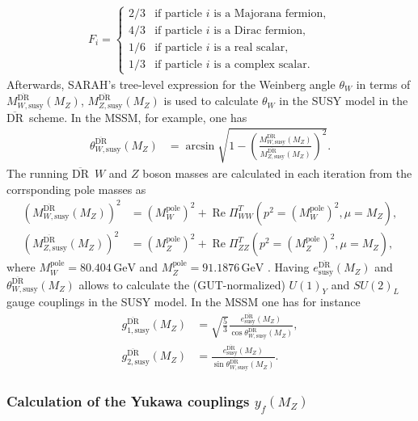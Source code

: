 \documentclass[final,3p,11pt,pdflatex]{elsarticle}
\newcommand{\textoverline}[1]{$\overline{\mbox{#1}}$}
\newcommand{\DRbar}{\textoverline{DR}\xspace}
\newcommand{\unit}[1]{\,\text{#1}}      %
\DeclareMathOperator{\re}{Re}
\begin{document}
%
\begin{align}
  F_i =
  \begin{cases}
    2/3 & \text{if particle $i$ is a Majorana fermion},\\
    4/3 & \text{if particle $i$ is a Dirac fermion},\\
    1/6 & \text{if particle $i$ is a real scalar},\\
    1/3 & \text{if particle $i$ is a complex scalar}.
  \end{cases}
\end{align}
%
Afterwards, SARAH's tree-level expression for the Weinberg angle
$\theta_W$ in terms of $M_{W,\text{susy}}^{\text{\DRbar}}(M_Z)$,
$M_{Z,\text{susy}}^{\text{\DRbar}}(M_Z)$ is used to calculate
$\theta_W$ in the SUSY model in the \DRbar\ scheme.  In the MSSM, for
example, one has
%
\begin{align}
  \theta_{W,\text{susy}}^{\text{\DRbar}}(M_Z) &= \arcsin\sqrt{1 -
    \left(\frac{M_{W,\text{susy}}^{\text{\DRbar}}(M_Z)}{M_{Z,\text{susy}}^{\text{\DRbar}}(M_Z)}\right)^2}
  .
\end{align}
%
The running \DRbar\ $W$ and $Z$ boson masses are calculated in each
iteration from the corrsponding pole masses as
%
\begin{align}
  \left(M_{W,\text{susy}}^{\text{\DRbar}}(M_Z)\right)^2 &=
  \left(M_W^{\text{pole}}\right)^2 + \re \Pi_{WW}^T(p^2 = (M_W^{\text{pole}})^2, \mu=M_Z) ,\\
  \left(M_{Z,\text{susy}}^{\text{\DRbar}}(M_Z)\right)^2 &=
  \left(M_Z^{\text{pole}}\right)^2 + \re \Pi_{ZZ}^T(p^2 = (M_Z^{\text{pole}})^2, \mu=M_Z) ,
\end{align}
%
where $M_W^{\text{pole}} = 80.404\unit{GeV}$ and $M_Z^{\text{pole}} =
91.1876\unit{GeV}$ \cite{Beringer:1900zz}.  Having
$e_{\text{susy}}^{\text{\DRbar}}(M_Z)$ and
$\theta_{W,\text{susy}}^{\text{\DRbar}}(M_Z)$ allows to calculate the
(GUT-normalized) $U(1)_Y$ and $SU(2)_L$ gauge couplings in the SUSY
model.  In the MSSM one has for instance
%
\begin{align}
  g_{1,\text{susy}}^{\text{\DRbar}}(M_Z) &=
  \sqrt{\frac{5}{3}} \frac{e_{\text{susy}}^{\text{\DRbar}}(M_Z)}{\cos\theta_{W,\text{susy}}^{\text{\DRbar}}(M_Z)} ,\\
  g_{2,\text{susy}}^{\text{\DRbar}}(M_Z) &=
  \frac{e_{\text{susy}}^{\text{\DRbar}}(M_Z)}{\sin\theta_{W,\text{susy}}^{\text{\DRbar}}(M_Z)} .
\end{align}

\subsubsection{Calculation of the Yukawa couplings $y_f(M_Z)$}
\label{sec:calculation-of-yukawa-couplings}
\end{document}
